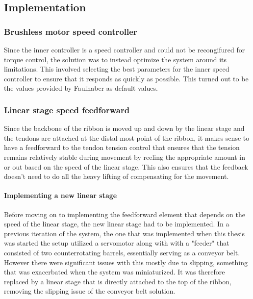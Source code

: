 

\subsection{Implementation}

\subsubsection{Brushless motor speed controller}
Since the inner controller is a speed controller and could not be recongifured for torque control, the solution was to instead optimize the system around its limitations. This involved selecting the best parameters for the inner speed controller to ensure that it responds as quickly as possible. This turned out to be the values provided by Faulhaber as default values. 

\subsubsection{Linear stage speed feedforward}
Since the backbone of the ribbon is moved up and down by the linear stage and the tendons are attached at the distal most point of the ribbon, it makes sense to have a feedforward to the tendon tension control that ensures that the tension remains relatively stable during movement by reeling the appropriate amount in or out based on the speed of the linear stage. This also ensures that the feedback doesn't need to do all the heavy lifting of compensating for the movement.

\paragraph*{Implementing a new linear stage}
Before moving on to implementing the feedforward element that depends on the speed of the linear stage, the new linear stage had to be implemented. In a previous iteration of the system, the one that was implemented when this thesis was started the setup utilized a servomotor along with with a "feeder" that consisted of two counterrotating barrels, essentially serving as a conveyor belt. However there were significant issues with this mostly due to slipping, something that was exacerbated when the system was miniaturized. It was therefore replaced by a linear stage that is directly attached to the top of the ribbon, removing the slipping issue of the conveyor belt solution.

